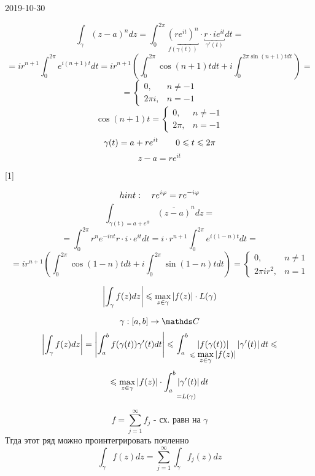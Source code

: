 \documentclass[12pt, fleqn]{article}
\begin{document}
\begin{lect}{2019-10-30}
     \begin{Example}[1]
         \[\int_\gamma (z - a)^n dz = \int_0^{2\pi} \underbracket{(re^{it} )^n
         }_{f(\gamma(t))} \cdot \underbracket{r \cdot ie^{it} }_{\gamma'(t)} dt = \]
         \[=ir^{n + 1} \int_0^{2\pi}e^{i(n + 1)t}dt = ir^{n + 1} (\int_0^{2\pi} 
         \cos(n + 1)tdt + i\int_0^{2\pi \sin(n + 1)tdt} ) =   \]
         \[= \begin{cases}
             0,  & n \neq -1\\
             2\pi i, & n = -1
         \end{cases}\]
         \[\cos(n + 1)t = \begin{cases}
             0, & n \neq -1\\
             2\pi, & n = -1
         \end{cases}\]
         \[\gamma(t) = a + re^{it} \qquad 0 \leqslant t \leqslant 2\pi \]
         \[z - a = re^{it} \]
     \end{Example}[1]

     \begin{Example}[2]
         \[hint: \quad r e^{i\varphi} = r e^{-i \varphi}  \]
         \[\int_{\gamma(t) = a + e^{it} } \overline{(z - a)}^n dz =  \]
         \[=\int_0^{2\pi} r^n e^{-int} r \cdot i \cdot e^{it}dt = 
         i \cdot r^{n + 1}  \int_0^{2\pi} e^{i(1 - n)t}dt =  \]
         \[=ir^{n + 1} \left(\int_0^{2\pi} \cos(1 - n)tdt + i\int_0^{2\pi} 
         \sin(1 - n)tdt\right) = \begin{cases}
             0, & n \neq 1\\
             2\pi i r^2, & n = 1
         \end{cases}\]
     \end{Example}

     \begin{Utv}
         \[\left|\int_\gamma f(z)dz\right| \leqslant \max_{z \in \gamma} \left|f(z)\right| \cdot L(\gamma)\]
     \end{Utv}

     \begin{Proof}
         \[\gamma : [a, b] \to \CC\]
         \[\left|\int_\gamma f(z)dz\right| = \left|\int_a^b f(\gamma(t)) \gamma'(t)dt\right| \leqslant 
         \int_a^b \underset{\leqslant \displaystyle \max_{z \in \gamma}
     \left|f(z)\right|}{\left|f(\gamma(t))\right| }\left|\gamma'(t)\right|dt \leqslant \]
     \[\leqslant \max_{z \in \gamma} \left|f(z)\right| \cdot \underset{= L(\gamma)}{\int_a^b \left|\gamma'(t)\right|dt }\]
     \end{Proof}

     \begin{Consequence}
         \[f = \sum_{j = 1}^\infty f_j \text{ - сх. равн на } \gamma \]
         Тгда этот ряд можно проинтегрировать почленно
         \[\int_\gamma f(z)dz = \sum_{j = 1}^\infty \int_\gamma f_j(z)dz\]
     \end{Consequence}


\end{lect}
\end{document}
